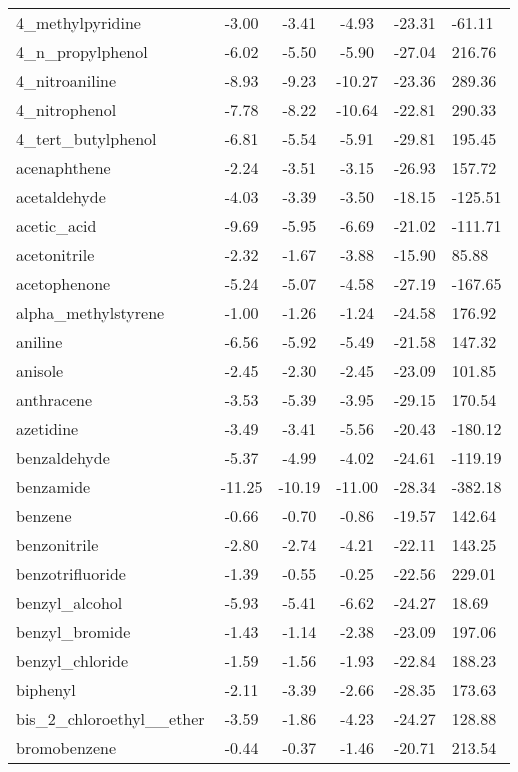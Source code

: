 \documentclass{amsart}
\begin{document}
\begin{longtable}{L|C|C|C|X|X}
4\_methylpyridine & -3.00 & -3.41 & -4.93 & -23.31 & -61.11 \\ 
4\_n\_propylphenol & -6.02 & -5.50 & -5.90 & -27.04 & 216.76 \\ 
4\_nitroaniline & -8.93 & -9.23 & -10.27 & -23.36 & 289.36 \\ 
4\_nitrophenol & -7.78 & -8.22 & -10.64 & -22.81 & 290.33 \\ 
4\_tert\_butylphenol & -6.81 & -5.54 & -5.91 & -29.81 & 195.45 \\ 
acenaphthene & -2.24 & -3.51 & -3.15 & -26.93 & 157.72 \\ 
acetaldehyde & -4.03 & -3.39 & -3.50 & -18.15 & -125.51 \\ 
acetic\_acid & -9.69 & -5.95 & -6.69 & -21.02 & -111.71 \\ 
acetonitrile & -2.32 & -1.67 & -3.88 & -15.90 & 85.88 \\ 
acetophenone & -5.24 & -5.07 & -4.58 & -27.19 & -167.65 \\ 
alpha\_methylstyrene & -1.00 & -1.26 & -1.24 & -24.58 & 176.92 \\ 
aniline & -6.56 & -5.92 & -5.49 & -21.58 & 147.32 \\ 
anisole & -2.45 & -2.30 & -2.45 & -23.09 & 101.85 \\ 
anthracene & -3.53 & -5.39 & -3.95 & -29.15 & 170.54 \\ 
azetidine & -3.49 & -3.41 & -5.56 & -20.43 & -180.12 \\ 
benzaldehyde & -5.37 & -4.99 & -4.02 & -24.61 & -119.19 \\ 
benzamide & -11.25 & -10.19 & -11.00 & -28.34 & -382.18 \\ 
benzene & -0.66 & -0.70 & -0.86 & -19.57 & 142.64 \\ 
benzonitrile & -2.80 & -2.74 & -4.21 & -22.11 & 143.25 \\ 
benzotrifluoride & -1.39 & -0.55 & -0.25 & -22.56 & 229.01 \\ 
benzyl\_alcohol & -5.93 & -5.41 & -6.62 & -24.27 & 18.69 \\ 
benzyl\_bromide & -1.43 & -1.14 & -2.38 & -23.09 & 197.06 \\ 
benzyl\_chloride & -1.59 & -1.56 & -1.93 & -22.84 & 188.23 \\ 
biphenyl & -2.11 & -3.39 & -2.66 & -28.35 & 173.63 \\ 
bis\_2\_chloroethyl\_\_ether & -3.59 & -1.86 & -4.23 & -24.27 & 128.88 \\ 
bromobenzene & -0.44 & -0.37 & -1.46 & -20.71 & 213.54 \\ 

\end{longtable}
\end{document}
